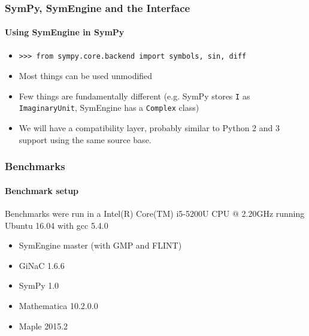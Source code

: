 \documentclass{beamer}
\begin{document}
\begin{frame}[fragile]
\frametitle{SymPy, SymEngine and the Interface}
\framesubtitle{Using SymEngine in SymPy}
\begin{itemize}
\item
\begin{verbatim}
>>> from sympy.core.backend import symbols, sin, diff
\end{verbatim}
\item Most things can be used unmodified
\item Few things are fundamentally different (e.g. SymPy stores \texttt{I} as
    \texttt{ImaginaryUnit}, SymEngine has a \texttt{Complex} class)
\item We will have a compatibility layer, probably similar to Python 2 and 3
    support using the same source base.
\end{itemize}
\end{frame}




\begin{frame}
\frametitle{Benchmarks}
\framesubtitle{Benchmark setup}
Benchmarks were run in a Intel(R) Core(TM) i5-5200U CPU @ 2.20GHz running Ubuntu 16.04 with gcc 5.4.0
\begin{itemize}
 \item SymEngine master (with GMP and FLINT)
 \item GiNaC 1.6.6
 \item SymPy 1.0
 \item Mathematica 10.2.0.0
 \item Maple 2015.2
\end{itemize}
\end{frame}




\end{document}
